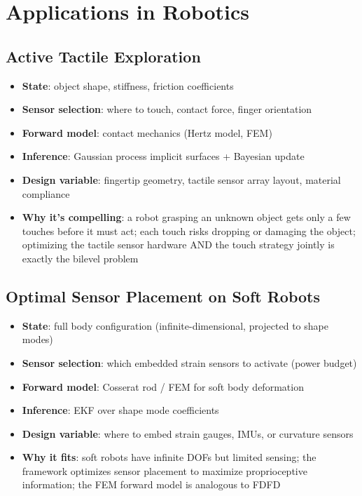 \documentclass[11pt,a4paper]{article}
\begin{document}
\section{Applications in Robotics}

\subsection{Active Tactile Exploration}

\begin{itemize}[nosep]
  \item \textbf{State}: object shape, stiffness, friction coefficients
  \item \textbf{Sensor selection}: where to touch, contact force, finger orientation
  \item \textbf{Forward model}: contact mechanics (Hertz model, FEM)
  \item \textbf{Inference}: Gaussian process implicit surfaces + Bayesian update
  \item \textbf{Design variable}: fingertip geometry, tactile sensor array layout, material compliance
  \item \textbf{Why it's compelling}: a robot grasping an unknown object gets only a few touches before it must act; each touch risks dropping or damaging the object; optimizing the tactile sensor hardware AND the touch strategy jointly is exactly the bilevel problem
\end{itemize}

\subsection{Optimal Sensor Placement on Soft Robots}

\begin{itemize}[nosep]
  \item \textbf{State}: full body configuration (infinite-dimensional, projected to shape modes)
  \item \textbf{Sensor selection}: which embedded strain sensors to activate (power budget)
  \item \textbf{Forward model}: Cosserat rod / FEM for soft body deformation
  \item \textbf{Inference}: EKF over shape mode coefficients
  \item \textbf{Design variable}: where to embed strain gauges, IMUs, or curvature sensors
  \item \textbf{Why it fits}: soft robots have infinite DOFs but limited sensing; the framework optimizes sensor placement to maximize proprioceptive information; the FEM forward model is analogous to FDFD
\end{itemize}
\end{document}
